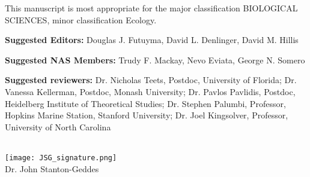 \documentclass[letterpaper]{article}
\begin{document}
This manuscript is most appropriate for the major classification
BIOLOGICAL SCIENCES, minor classification Ecology.

\textbf{Suggested Editors:} Douglas J. Futuyma, David L. Denlinger, David M. Hillis

\textbf{Suggested NAS Members:} Trudy F. Mackay, Nevo Eviata, George N. Somero

\textbf{Suggested reviewers:}  Dr. Nicholas Teets, Postdoc, University of Florida; Dr. Vanessa Kellerman, Postdoc, Monash University; Dr. Pavlos Pavlidis, Postdoc, Heidelberg Institute of Theoretical Studies; Dr. Stephen Palumbi, Professor, Hopkins Marine Station, Stanford University; Dr. Joel Kingsolver, Professor, University of North Carolina

 \\
\texttt{[image: JSG\_signature.png]}  \\

Dr. John Stanton-Geddes
\end{document}
